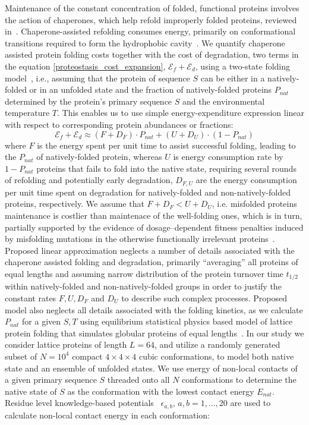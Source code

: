 \documentclass[10pt,letterpaper]{article}
\begin{document}
Maintenance of the constant concentration of folded, functional proteins involves the action of chaperones, which help refold improperly folded proteins, reviewed in~\cite{Hartl2011Molecular}. Chaperone-assisted refolding consumes energy, primarily on conformational transitions required to form the hydrophobic cavity~\cite{Hartl2011Molecular}. We quantify chaperone assisted protein folding costs together with the cost of degradation, two terms in the equation \eqref{proteostasis_cost_expansion}, $\mathcal{E}_{f} + \mathcal{E}_{d}$, using a two-state folding model~\cite{Mirny2001Protein,Dill1995Principles}, i.e., assuming that the protein of sequence $S$ can be either in a natively-folded or in an unfolded state and the fraction of natively-folded proteins $P_{nat}$ determined by the protein's primary sequence $S$ and the environmental temperature $T$. This enables us to use simple energy-expenditure expression linear with respect to corresponding protein abundances or fractions:
\begin{equation}
	\label{chaperone_degradation_cost}
	\mathcal{E}_{f} + \mathcal{E}_{d} \approx (F+D_{F})\cdot P_{nat} + (U+D_{U})\cdot\left(1-P_{nat}\right)
\end{equation}
where $F$ is the energy spent per unit time to assist successful folding, leading to the $P_{nat}$ of natively-folded protein, whereas $U$ is energy consumption rate by $1-P_{nat}$ proteins that fails to fold into the native state, requiring several rounds of refolding and potentially early degradation, $D_{F,U}$ are the energy consumption per unit time spent on degradation for natively-folded and non-natively-folded proteins, respectively. We assume that $F+D_{F}<U+D_{U}$, i.e. misfolded proteins maintenance is costlier than maintenace of the well-folding ones, which is in turn, partially supported by the evidence of dosage--dependent fitness penalties induced by misfolding mutations in the otherwise functionally irrelevant proteins~\cite{Samerotte2011Misfolded}. Proposed linear approximation neglects a number of details associated with the chaperone assisted folding and degradation, primarily ``averaging'' all proteins of equal lengths and assuming narrow distribution of the protein turnover time $t_{1/2}$ within natively-folded and non-natively-folded groups in order to justify the constant rates $F,U,D_{F}$ and $D_{U}$ to describe such complex processes. Proposed model also neglects all details associated with the folding kinetics, as we calculate $P_{nat}$ for a given $S,T$ using equilibrium statistical physics based model of lattice protein folding that simulates globular proteins of equal lengths~\cite{Shakhnovich1990Enumeration}. In our study we consider lattice proteins of length $L=64$, and utilize a randomly generated subset of $N=10^{4}$ compact $4\times4\times4$ cubic conformations, to model both native state and an ensemble of unfolded states. We use energy of non-local contacts of a given primary sequence $S$ threaded onto all $N$ conformations to determine the native state of $S$ as the conformation with the lowest contact energy $E_{nat}$. Residue level knowledge-based potentials~\cite{Miyazawa1999SelfConsistent} $\epsilon_{a,b},\, a,b=1,\dots,20$ are used to calculate non-local contact energy in each conformation:
\end{document}
